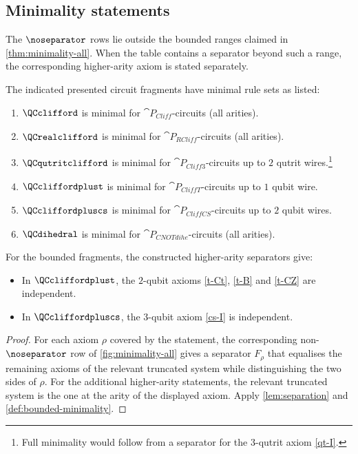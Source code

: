 \subsection{Minimality statements}

The \(\noseparator\) rows lie outside the bounded ranges claimed in \cref{thm:minimality-all}.  When
the table contains a separator beyond such a range, the corresponding higher-arity axiom is stated
separately.

\begin{theorem}\label{thm:minimality-all}
The indicated presented circuit fragments have minimal rule sets as listed:
\begin{enumerate}
\item \(\QCclifford\) is minimal for \(\cat{P}_{\mathit{Cliff}}\)-circuits (all arities).
\item \(\QCrealclifford\) is minimal for \(\cat{P}_{\mathit{RCliff}}\)-circuits (all arities).
\item \(\QCqutritclifford\) is minimal for \(\cat{P}_{\mathit{Cliff3}}\)-circuits up to \(2\) qutrit wires.\footnote{Full minimality would follow from a separator for the \(3\)-qutrit axiom \cref{qt-I}.}
\item \(\QCcliffordplust\) is minimal for \(\cat{P}_{\mathit{CliffT}}\)-circuits up to \(1\) qubit wire.
\item \(\QCcliffordpluscs\) is minimal for \(\cat{P}_{\mathit{CliffCS}}\)-circuits up to \(2\) qubit wires.
\item \(\QCdihedral\) is minimal for \(\cat{P}_{\mathit{CNOTdihe}}\)-circuits (all arities).
\end{enumerate}

For the bounded fragments, the constructed higher-arity separators give:
\begin{itemize}
\item In \(\QCcliffordplust\), the \(2\)-qubit axioms \eqref{t-Ct}, \eqref{t-B} and \eqref{t-CZ}
      are independent.
\item In \(\QCcliffordpluscs\), the \(3\)-qubit axiom \eqref{cs-I} is independent.
\end{itemize}
\end{theorem}

\begin{proof}
For each axiom \(\rho\) covered by the statement, the corresponding non-\(\noseparator\) row of
\cref{fig:minimality-all} gives a separator \(F_\rho\) that equalises the
remaining axioms of the relevant truncated system while distinguishing the two sides of \(\rho\).
For the additional higher-arity statements, the relevant truncated system is the one at the arity of
the displayed axiom.  Apply \cref{lem:separation} and
\cref{def:bounded-minimality}.
\end{proof}
